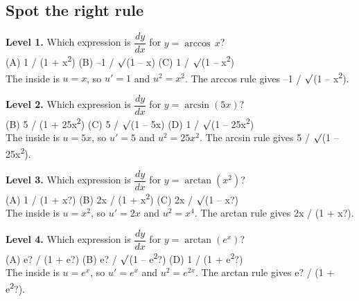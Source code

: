 \documentclass[11pt]{article}
\begin{document}
\subsection*{Spot the right rule}
\noindent\textbf{Level 1.} Which expression is $\dfrac{dy}{dx}$ for $y=\arccos\,x$?\\ (A) 1 / (1 + x\textsuperscript{2}) \quad (B) --1 / $\surd$(1 -- x) \quad (C) 1 / $\surd$(1 -- x\textsuperscript{2}) \quad {}\\  \quad The inside is $u=x$, so $u'=1$ and $u^2=x^2$. The arccos rule gives --1 / $\surd$(1 -- x\textsuperscript{2}).\par\medskip
\noindent\textbf{Level 2.} Which expression is $\dfrac{dy}{dx}$ for $y=\arcsin\left(5x\right)$?\\  \quad (B) 5 / (1 + 25x\textsuperscript{2}) \quad (C) 5 / $\surd$(1 -- 5x) \quad (D) 1 / $\surd$(1 -- 25x\textsuperscript{2})\\  \quad The inside is $u=5x$, so $u'=5$ and $u^2=25x^2$. The arcsin rule gives 5 / $\surd$(1 -- 25x\textsuperscript{2}).\par\medskip
\noindent\textbf{Level 3.} Which expression is $\dfrac{dy}{dx}$ for $y=\arctan\left(x^{2}\right)$?\\ (A) 1 / (1 + x?) \quad (B) 2x / (1 + x\textsuperscript{2}) \quad (C) 2x / $\surd$(1 -- x?) \quad {}\\  \quad The inside is $u=x^{2}$, so $u'=2x$ and $u^2=x^4$. The arctan rule gives 2x / (1 + x?).\par\medskip
\noindent\textbf{Level 4.} Which expression is $\dfrac{dy}{dx}$ for $y=\arctan\left(e^{x}\right)$?\\ (A) e? / (1 + e?) \quad (B) e? / $\surd$(1 -- e\textsuperscript{2}?) \quad {} \quad (D) 1 / (1 + e\textsuperscript{2}?)\\  \quad The inside is $u=e^{x}$, so $u'=e^{x}$ and $u^2=e^{2x}$. The arctan rule gives e? / (1 + e\textsuperscript{2}?).\par\medskip
\end{document}
